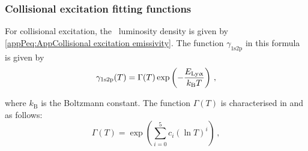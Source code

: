 \subsubsection{Collisional excitation fitting functions}

For collisional excitation, the \lya\ luminosity density is given by \cref{appPeq:AppCollisional excitation emissivity}. The function $\gamma_\text{1s2p}$ in this formula is given by
\begin{equation}
    \gamma_\text{1s2p} (T) = \Gamma(T) \exp \left( -\frac{E_\text{{Ly\ensuremath{\upalpha}}}}{k_\text{B}T} \right) \, ,
\end{equation}

\noindent where $k_\text{B}$ is the Boltzmann constant. The function $\Gamma(T)$ is characterised in \citet{1990MNRAS.242..692S} and \citet{1991ApJ...380..302S} as follows:
\begin{equation}
    \label{appPeq:Gamma}
    \Gamma (T) = \exp \left( \sum_{i=0}^{5} c_i \left( \ln T \right)^i \right) \, ,
\end{equation}

